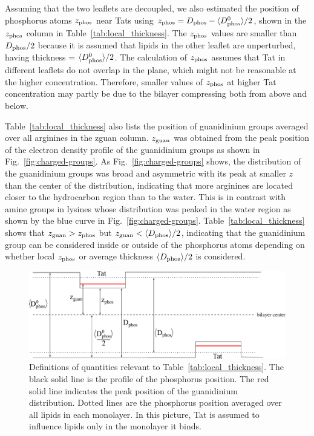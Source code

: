 Assuming that the two leaflets are decoupled, we also estimated the position
of phosphorus atoms $z_\textrm{phos}$ near Tats 
using $z_\textrm{phos} = D_\text{phos} - \langle D_\text{phos}^0\rangle/2$, shown in the $z_\textrm{phos}$ column
in Table~\ref{tab:local_thickness}. 
The $z_\textrm{phos}$ values are smaller than $D_\text{phos} /2$
because it is assumed that lipids in the other leaflet are unperturbed,
having thickness = $\langle D_\text{phos}^0\rangle/2$.
The calculation of $z_\textrm{phos}$ assumes that Tat in different leaflets do not
overlap in the plane, which might not be reasonable at the higher concentration.
Therefore, smaller values of $z_\textrm{phos}$ at higher Tat concentration
may partly be due to the bilayer compressing both from above and below.

Table~\ref{tab:local_thickness} also lists
the position of guanidinium groups averaged
over all arginines in the \gls{zguan} column. $z_\textrm{guan}$ was obtained
from the peak position of the electron density profile of the guanidinium groups 
as shown in Fig.~\ref{fig:charged-groups}. As Fig.~\ref{fig:charged-groups} shows,
the distribution of the guanidinium groups was broad and 
asymmetric with its peak at smaller $z$ than the center
of the distribution, indicating that more arginines are located closer to the
hydrocarbon region than to the water. This is in contrast with amine groups
in lysines whose distribution was peaked in the water region as shown by
the blue curve in Fig.~\ref{fig:charged-groups}.
Table~\ref{tab:local_thickness} shows that $z_\textrm{guan} > z_\textrm{phos}$ but
$z_\textrm{guan} < \langle D_\text{phos}\rangle/2$, indicating that the guanidinium group 
can be considered inside or outside of the phosphorus atoms depending on
whether local $z_\textrm{phos}$ or average thickness $\langle D_\text{phos}\rangle/2$ is considered.

\begin{figure}[htbp]
  \centering
  \includegraphics[width=\textwidth]{figures/Tat/MD_Results/dimensions}
  \caption[Definitions of quantities relevant to Table~\ref{tab:local_thickness}]
  {Definitions of quantities relevant to Table~\ref{tab:local_thickness}.
  The black solid line is the profile of the phosphorus position.
  The red solid line indicates the peak position of the guanidinium 
  distribution. Dotted lines are the phosphorus position averaged over all
  lipids in each monolayer. In this picture, Tat is assumed to influence
  lipids only in the monolayer it binds.}
  \label{fig:Dphos_dimensions}
\end{figure} 


